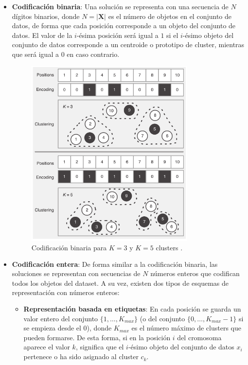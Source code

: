 \begin{itemize}
	\item \textbf{Codificación binaria}: Una solución se representa con una secuencia de $N$ dígitos binarios, donde $N=|\textbf{X}|$ es el número de objetos en el conjunto de datos, de forma que cada posición corresponde a un objeto del conjunto de datos. El valor de la $i$-ésima posición será igual a $1$ si el $i$-ésimo objeto del conjunto de datos corresponde a un centroide o prototipo de cluster, mientras que será igual a $0$ en caso contrario.
	
	\begin{figure}[h]
	\centering
	\includegraphics[width=0.8\textwidth]{Images/binary}
	\caption[Codificación binaria para $K=3$ y $K=5$ clusters.]{Codificación binaria para $K=3$ y $K=5$ clusters \cite{jose2016automatic}.}
	\label{fig:binaryencod}
\end{figure}
	
	\item \textbf{Codificación entera}: De forma similar a la codificación binaria, las soluciones se representan con secuencias de $N$ números enteros que codifican todos los objetos del dataset. A su vez, existen dos tipos de esquemas de representación con números enteros:
	\begin{itemize}
		\item \textbf{Representación basada en etiquetas}: En cada posición se guarda un valor entero del conjunto $\{1, \dots, K_{max} \}$ (o del conjunto $\{0, \dots, K_{max}-1 \}$ si se empieza desde el $0$), donde $K_{max}$ es el número máximo de clusters que pueden formarse. De esta forma, si en la posición $i$ del cromosoma aparece el valor $k$, significa que el $i$-ésimo objeto del conjunto de datos $x_i$ pertenece o ha sido asignado al cluster $c_k$.
		

\end{itemize}
\end{itemize}
